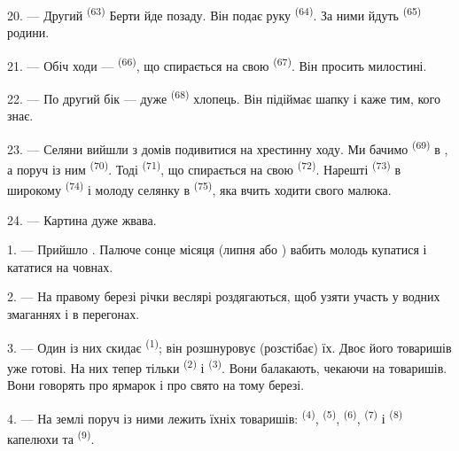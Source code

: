 20. --- Другий  \textsuperscript{(63)} Берти йде позаду. Він подає
руку  \textsuperscript{(64)}. За ними йдуть 
\textsuperscript{(65)} родини.

\VUsaut{4.6mm}
\VUsaut{3.4mm}

21. --- Обіч ходи ---  \textsuperscript{(66)}, що спирається на
свою  \textsuperscript{(67)}. Він просить милостині.

22. --- По другий бік --- дуже  \textsuperscript{(68)} хлопець.
Він підіймає шапку і каже  тим, кого знає.

23. --- Селяни вийшли з домів подивитися на хрестинну ходу. Ми бачимо
 \textsuperscript{(69)} в , а поруч
із ним  \textsuperscript{(70)}. Тоді 
\textsuperscript{(71)}, що спирається на свою 
\textsuperscript{(72)}. Нарешті  \textsuperscript{(73)} в
широкому  \textsuperscript{(74)} і молоду селянку в
 \textsuperscript{(75)}, яка вчить ходити свого
малюка.

24. --- Картина дуже жвава.
\VUsaut{4.0mm}

\VUsaut{3.0mm}

\VUsaut{2.4mm}

\VUsaut{3.0mm}

1. --- Прийшло . Палюче сонце місяця  (липня або
) вабить молодь купатися і кататися на човнах.

2. --- На правому березі річки веслярі роздягаються, щоб узяти участь у водних
змаганнях і в перегонах.

3. --- Один із них скидає  \textsuperscript{(1)}; він
розшнуровує (розстібає) їх. Двоє його товаришів уже готові. На них тепер тільки
 \textsuperscript{(2)} і  \textsuperscript{(3)}.
Вони балакають, чекаючи на товаришів. Вони говорять про ярмарок і про свято на
тому березі.

4. --- На землі поруч із ними лежить  їхніх товаришів:
  \textsuperscript{(4)}, 
\textsuperscript{(5)},  \textsuperscript{(6)},
 \textsuperscript{(7)} і 
\textsuperscript{(8)} капелюхи та  \textsuperscript{(9)}.

